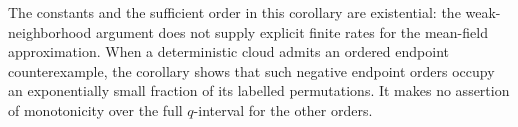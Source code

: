 The constants and the sufficient order in this corollary are
existential: the weak-neighborhood argument does not supply explicit
finite rates for the mean-field approximation. When a deterministic
cloud admits an ordered endpoint counterexample, the corollary shows
that such negative endpoint orders occupy an exponentially small
fraction of its labelled permutations. It makes no assertion of
monotonicity over the full \(q\)-interval for the other orders.
